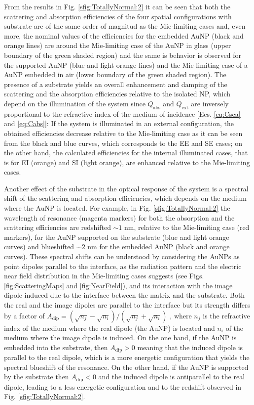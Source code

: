 From the results in Fig. \ref{sfig:TotallyNormal:2} it can be seen that both the scattering and absorption efficiencies of the four spatial configurations with substrate are of the same order of magnitud as the Mie-limiting cases and, even more, the nominal values of the efficiencies for the embedded AuNP (black and orange lines) are around the Mie-limiting case of the AuNP in glass (upper boundary of the green shaded region) and the same is behavior is observed for the supported AuNP (blue and light orange lines) and the Mie-limiting case of a AuNP embedded in air (lower boundary of the green shaded region). The presence of a substrate yields an overall enhancement and damping of the scattering and the absorption efficiencies relative to the isolated NP, which depend on the illumination of the system since $Q_\text{abs}$ and $Q_\text{ext}$ are inversely proportional to the refractive index of the medium of incidence [Ecs. \eqref{eq:Csca} and \eqref{eq:Cabs}]: If the system is illuminated in an external configuration, the obtained efficiencies decrease relative to the Mie-limiting case as it can be seen from the black  and blue curves, which corresponds to the EE and SE cases; on the other hand, the calculated efficiencies for the internal illuminated cases, that is for EI (orange) and SI (light orange), are enhanced relative to the Mie-limiting cases.

Another effect of the substrate in the optical response of the system is a spectral shift of the scattering and absorption efficiencies, which depends on the medium where the AuNP is located. For example, in Fig. \ref{sfig:TotallyNormal:2} the wavelength of resonance (magenta markers) for both the absorption and the scattering efficiencies are redshifted $\sim 1$ nm, relative to the Mie-limiting case (red markers), for the AuNP supported on the substrate (blue and light orange curves) and blueshifted $\sim 2$ nm for the embedded AuNP (black and orange curves). These spectral shifts can be understood by considering the AuNPs as point dipoles parallel to the interface, as the radiation pattern and the electric near field distribution in the Mie-limiting cases suggests (see Figs. \ref{fig:ScatteringMaps} and  \ref{fig:NearField}), and its interaction with the image dipole induced due to the interface between the matrix and the substrate. Both the real and the image dipoles are parallel to the interface but its strength differs by  a factor of $A_\text{dip} = (\sqrt{n_j}-\sqrt{n_i}) / (\sqrt{n_j}+\sqrt{n_i})$ \cite{barrera1991optical}, where $n_{j}$ is the refractive index of the medium where the real dipole (the AuNP) is located and $n_i$ of the medium where the image dipole is induced. On the one hand, if the AuNP is embedded into the substrate, then $A_\text{dip}>0$ meaning that the induced dipole is parallel to the real dipole, which is a more energetic configuration that yields the spectral blueshift of the resonance. On the other hand, if the AuNP is supported by the substrate then $A_\text{dip}<0$ and the induced dipole is antiparallel to the real dipole, leading to a less energetic configuration and to the redshift observed in Fig. \ref{sfig:TotallyNormal:2}.%

